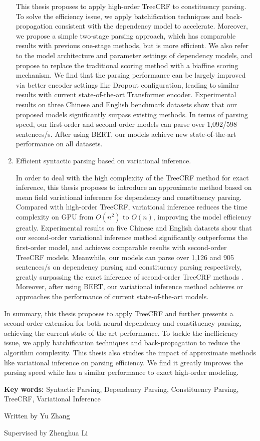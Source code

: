 \begin{eabstract}
\begin{enumerate}
		      This thesis proposes to apply high-order TreeCRF to constituency parsing.
		      To solve the efficiency issue, we apply batchification techniques and back-propagation consistent with the dependency model to accelerate.
		      Moreover, we propose a simple two-stage parsing approach, which has comparable results with previous one-stage methods, but is more efficient.
		      We also refer to the model architecture and parameter settings of dependency models, and propose to replace the traditional scoring method with a biaffine scoring mechanism.
		      We find that the parsing performance can be largely improved via better encoder settings like Dropout configuration, leading to similar results with current state-of-the-art Transformer encoder.
		      Experimental results on three Chinese and English benchmark datasets show that our proposed models significantly surpass existing methods.
		      In terms of parsing speed, our first-order and second-order models can parse over 1,092/598 sentences/s.
		      After using BERT, our models achieve new state-of-the-art performance on all datasets.
		      
		\item Efficient syntactic parsing based on variational inference.
		      
		      In order to deal with the high complexity of the TreeCRF method for exact inference, this thesis proposes to introduce an approximate method based on mean field variational inference for dependency and constituency parsing.
		      Compared with high-order TreeCRF, variational inference reduces the time complexity on GPU from $O(n^2)$ to $O(n)$, improving the model efficiency greatly.
		      Experimental results on five Chinese and English datasets show that our second-order variational inference method significantly outperforms the first-order model, and achieves comparable results with second-order TreeCRF models.
		      Meanwhile, our models can parse over 1,126 and 905 sentences/s on dependency parsing and constituency parsing respectively, greatly surpassing the exact inference of second-order TreeCRF methods .
		      Moreover, after using BERT, our variational inference method achieves or approaches the performance of current state-of-the-art models.
		      
	\end{enumerate}
	
	In summary, this thesis proposes to apply TreeCRF and further presents a second-order extension for both neural dependency and constituency parsing, achieving the current state-of-the-art performance.
	To tackle the inefficiency issue, we apply batchification techniques and back-propagation to reduce the algorithm complexity.
	This thesis also studies the impact of approximate methods like variational inference on parsing efficiency.
	We find it greatly improves the parsing speed while has a similar performance to exact high-order modeling.
	
	\vskip 21bp
	{\bf{} Key words: }
	Syntactic Parsing,
	Dependency Parsing,
	Constituency Parsing,
	TreeCRF,
	Variational Inference
\end{eabstract}

\begin{flushright}
	Written by Yu Zhang
	
	Supervised by Zhenghua Li
\end{flushright}
